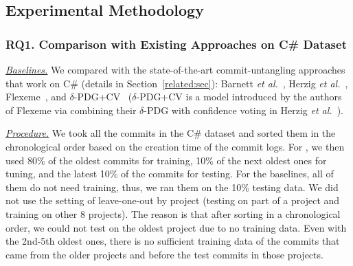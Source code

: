 

\subsection{Experimental Methodology}
\label{method:sec}

\subsubsection{\bf RQ1. Comparison with Existing Approaches on C\# Dataset}


{\em \underline{Baselines.}} We compared {\tool} with the
state-of-the-art commit-untangling approaches that work on C\#
(details in Section~\ref{related:sec}): Barnett {\em et
al.}~\cite{barnett-icse15}, Herzig {\em et al.}~\cite{kim-emse16},
Flexeme~\cite{flexeme-fse20}, and $\delta$-PDG+CV~\cite{flexeme-fse20}
($\delta$-PDG+CV is a model introduced by the authors of Flexeme via
combining their $\delta$-PDG with confidence voting in Herzig {\em et
al.}~\cite{kim-emse16}).



\textit{\underline{Procedure.}}
We took all the commits in the C\# dataset and sorted them in the
chronological order based on the creation time of the commit logs. For
{\tool}, we then used 80\% of the oldest commits for training, 10\% of
the next oldest ones for tuning, and the latest 10\% of the commits
for testing. For the baselines, all of them do not need training,
thus, we ran them on the 10\% testing data.
%
We did not use the setting of leave-one-out by project (testing on
part of a project and training on other 8 projects). The reason is
that after sorting in a chronological order, we could not test on the
oldest project due to no training data. Even with the 2nd-5th oldest
ones, there is no sufficient training data of the commits that came
from the older projects and before the test commits in those projects.

